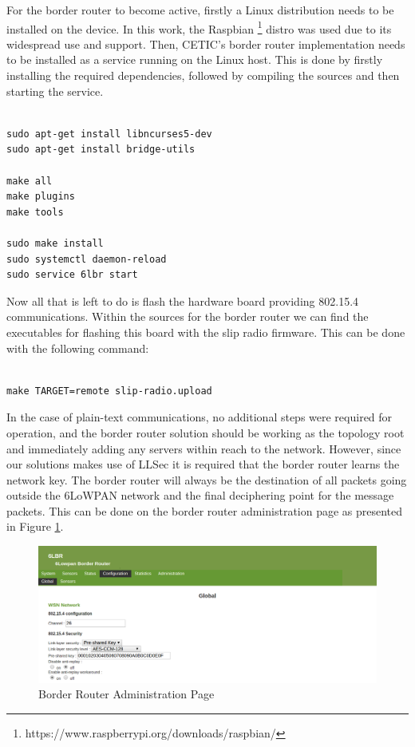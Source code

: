 For the border router to become active, firstly a Linux distribution needs to be installed on the device. In this work, the Raspbian \footnote{https://www.raspberrypi.org/downloads/raspbian/} distro was used due to its widespread use and support. Then, \gls{CETIC}'s border router implementation needs to be installed as a service running on the Linux host. This is done by firstly installing the required dependencies, followed by compiling the sources and then starting the service.

\begin{lstlisting}

sudo apt-get install libncurses5-dev
sudo apt-get install bridge-utils

make all
make plugins
make tools

sudo make install
sudo systemctl daemon-reload
sudo service 6lbr start

\end{lstlisting}

Now all that is left to do is flash the hardware board providing 802.15.4 communications. Within the sources for the border router we can find the executables for flashing this board with the slip radio firmware. This can be done with the following command:

\begin{lstlisting}

make TARGET=remote slip-radio.upload

\end{lstlisting}

In the case of plain-text communications, no additional steps were required for operation, and the border router solution should be working as the topology root and immediately adding any servers within reach to the network. However, since our solutions makes use of \gls{LLSec} it is required that the border router learns the network key. The border router will always be the destination of all packets going outside the \gls{6LoWPAN} network and the final deciphering point for the message packets. This can be done on the border router administration page as presented in Figure \ref{fig:administration_page}.

\begin{figure}[h]
  \centering
  \includegraphics[width=0.95\linewidth]{figures/border_router_page.png}
  \caption{Border Router Administration Page}
  \label{fig:administration_page}
\end{figure}

